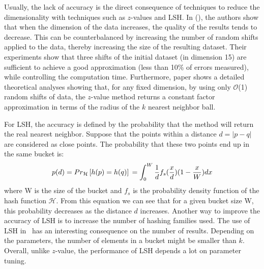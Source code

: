 
Usually, the lack of accuracy is the direct consequence of techniques to reduce the 
dimensionality with techniques such as $z$-values and LSH. In 
\cite{Zhang:2012:EPK:2247596.2247602} (\Z), the authors show that when the dimension of the 
data increases, the quality of 
the results tends to decrease. This can be counterbalanced by increasing the number of random 
shifts applied to the data, thereby 
increasing the size of the resulting dataset. Their experiments show that three 
shifts of the initial dataset (in dimension 15) are sufficient to achieve a good approximation 
(less than 10\% of errors measured), while controlling the computation time. 
Furthermore, paper \cite{5447837_full} shows a detailed theoretical analyses showing that, for any fixed dimension, by using only $\mathcal{O}$(1) random shifts of data, the $z$-value method returns a constant factor approximation in terms of the radius of the $k$ nearest neighbor ball.

For LSH, the accuracy is defined by the probability that the method will return the real nearest neighbor. Suppose that 
the points within a distance $d = \left|p-q\right|$ are considered as close points. The probability \cite{4472264} that 
these two points end up in the same bucket is: 
\begin{equation}
p(d) = Pr_\mathcal{H}\left[h(p)=h(q)\right] \\
=\int_{0}^{W} \frac{1}{d} f_s (\frac{x}{d})(1-\frac{x}{W})dx
\end{equation}
where W is the size of the bucket and $f_s$ is the probability density function of the hash function $\mathcal{H}$. 
From this equation we can see that for a given bucket size W, this probability decreases as the distance $d$ 
increases. Another way to improve the accuracy of LSH is to increase the number of hashing families
used. The use of LSH in \LSH~has an interesting consequence on the number of results. Depending on the parameters, 
the number of elements in a bucket might be smaller than $k$. 
Overall, unlike $z$-value, the performance of LSH depends a lot on parameter tuning. 


